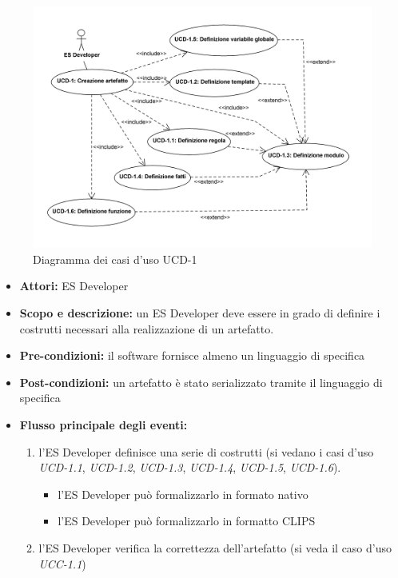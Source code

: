 
\begin{figure}
\centering
\includegraphics[width=1.1\textwidth]{Immagini/Capitolo2/UseCases/UCD-1.png}
\caption{Diagramma dei casi d'uso UCD-1}\label{fig:uc-ucd-1}
\end{figure}


\begin{itemize}
	\item \textbf{Attori:} ES Developer
	\item \textbf{Scopo e descrizione:} un ES Developer deve essere in grado di definire i costrutti necessari alla realizzazione di un artefatto.
	\item \textbf{Pre-condizioni:} il software fornisce almeno un linguaggio di specifica
	\item \textbf{Post-condizioni:} un artefatto è stato serializzato tramite il linguaggio di specifica
	\item \textbf{Flusso principale degli eventi:}
		\begin{enumerate}
			\item l'ES Developer definisce una serie di costrutti (si vedano i casi d'uso \emph{UCD-1.1}, \emph{UCD-1.2}, \emph{UCD-1.3}, \emph{UCD-1.4}, \emph{UCD-1.5}, \emph{UCD-1.6}).
			\begin{itemize}
				\item l'ES Developer può formalizzarlo in formato nativo
				\item l'ES Developer può formalizzarlo in formatto CLIPS
			\end{itemize}
			\item l'ES Developer verifica la correttezza dell'artefatto (si veda il caso d'uso \emph{UCC-1.1})
		\end{enumerate}
\end{itemize}


